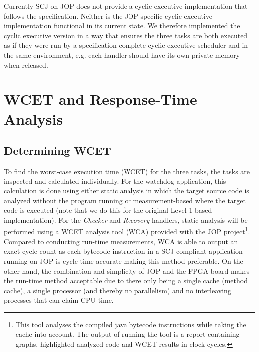 Currently SCJ on JOP does not provide a cyclic executive implementation that follows the specification. Neither is the JOP specific cyclic executive implementation functional in its current state. We therefore implemented the cyclic executive version in a way that ensures the three tasks are both executed as if they were run by a specification complete cyclic executive scheduler and in the same environment, e.g. each handler should have its own private memory when released.



\chapter{WCET and Response-Time Analysis}
\label{chapter:wcetrta}
\section{Determining WCET} %
\label{sec:determining_wcet}
To find the worst-case execution time (WCET) for the three tasks, the tasks are inspected and calculated individually. For the watchdog application, this calculation is done using either static analysis in which the target source code is analyzed without the program running or measurement-based where the target code is executed (note that we do this for the original Level 1 based implementation). For the \textit{Checker} and \textit{Recovery} handlers, static analysis will be performed using a WCET analysis tool (WCA) provided with the JOP project\footnote{This tool analyses the compiled java bytecode instructions while taking the cache into account. The output of running the tool is a report containing graphs, highlighted analyzed code and WCET results in clock cycles.}. Compared to conducting run-time measurements, WCA is able to output an exact cycle count as each bytecode instruction in a SCJ compliant application running on JOP is cycle time accurate making this method preferable. On the other hand, the combination and simplicity of JOP and the FPGA board makes the run-time method acceptable due to there only being a single cache (method cache), a single processor (and thereby no parallelism) and no interleaving processes that can claim CPU time.

